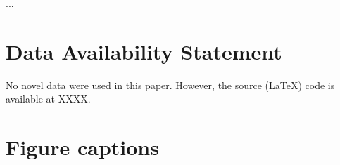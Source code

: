 \documentclass[utf8]{frontiersSCNS} %
\begin{document}
...



\section*{Data Availability Statement}

No novel data were used in this paper. However, the source (\LaTeX) code is available at XXXX.


% 



\section*{Figure captions}

\end{document}
